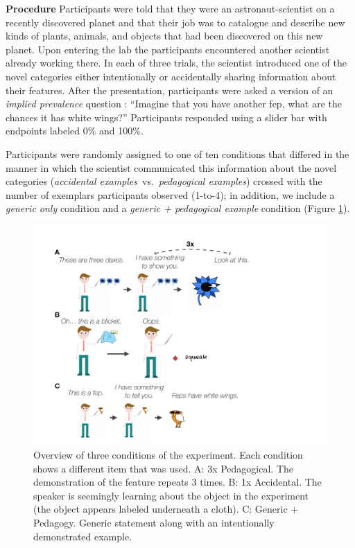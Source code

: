 \documentclass[10pt,letterpaper]{article}
\begin{document}
\noindent\textbf{Procedure}
Participants were told that they were an astronaut-scientist on a recently discovered planet and that their job was to catalogue and describe new kinds of plants, animals, and objects that had been discovered on this new planet.  
Upon entering the lab the participants encountered another scientist already working there. 
In each of three trials, the scientist introduced one of the novel categories either intentionally or accidentally sharing information about their features. 
After the presentation, participants were asked a version of an \emph{implied prevalence} question \cite{Gelman2002, Cimpian2010a, tessler2020learning}: ``Imagine that you have another fep, what are the chances it has white wings?'' 
Participants responded using a slider bar with endpoints labeled 0\% and 100\%.



Participants were randomly assigned to one of ten conditions that differed in the manner in which the scientist communicated this information about the novel categories (\emph{accidental examples}~vs.~\emph{pedagogical examples}) crossed with the number of exemplars participants observed (1-to-4); in addition, we include a \emph{generic only} condition and a \emph{generic + pedagogical example} condition (Figure \ref{fig:expt}). 

\begin{figure}[t]
\begin{center}
\includegraphics[width=\linewidth]{figs/expt-cartoon.pdf}
\end{center}
\caption{Overview of three conditions of the experiment. Each condition shows a different item that was used. A: 3x Pedagogical. The demonstration of the feature repeats 3 times. B: 1x Accidental. The speaker is seemingly learning about the object in the experiment (the object appears labeled underneath a cloth). C: Generic + Pedagogy. Generic statement along with an intentionally demonstrated example.}
\label{fig:expt}
\end{figure}
\end{document}
